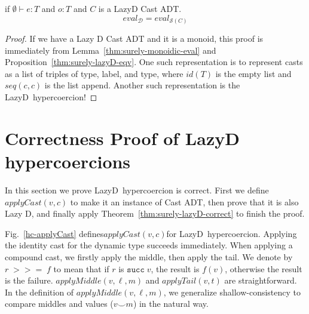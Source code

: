 \documentclass[acmsmall,review,anonymous]{acmart}\settopmatter{printfolios=true,printccs=false,printacmref=false}
\newcommand{\figref}[1]{Fig.~\ref{#1}}
\newcommand{\judgetype}[3]{#1 \vdash #2 : #3}
\newcommand{\lazyD}{Lazy\;D}
\newcommand{\rOOsucc}[1]{\mathtt{succ}\;#1}
\newcommand{\ineffCEKD}{$\mathcal{D}$}
\newcommand{\effCEK}[1]{$\mathcal{S}(#1)$}
\newcommand{\evalEqv}[2]{$eval_{\text{#1}} = eval_{\text{#2}}$}
\begin{document}
\begin{theorem}[\lazyD\ Cast ADT Respects \ineffCEKD]
	\label{thm:surely-lazyD-correct}
	if $\judgetype{\emptyset}{e}{T}$ and $o : T$ and $C$ is a 
	\lazyD{} Cast ADT.
	\[
	\text{\evalEqv{\ineffCEKD}{\effCEK{C}}}
	\]
\end{theorem}
\begin{proof}
	If we have a Lazy D Cast ADT and it is a monoid, this 
	proof is immediately from Lemma~\ref{thm:surely-monoidic-eval} and 
	Proposition~\ref{thm:surely-lazyD-eqv}. One such representation is to 
	represent casts as a list of triples of type, label, and type, where 
	$id(T)$ is the empty list and $seq(c,c)$ is the list append. Another such 
	representation is the \lazyD\ hypercoercion!
\end{proof}


\section{Correctness Proof of \lazyD{} hypercoercions}
\label{sec:hypercoercion-correctness}

In this section we prove \lazyD\ hypercoercion is 
correct. First we define$applyCast(v,c)$ to make it an instance of Cast ADT, 
then prove that it is also Lazy D, and finally apply 
Theorem~\ref{thm:surely-lazyD-correct} to finish the proof.

\figref{hc-applyCast} defines$applyCast(v,c)$for \lazyD\ hypercoercion. 
Applying the identity cast for the 
dynamic type succeeds immediately. When applying a compound cast, we firstly 
apply the middle, then apply the tail. We denote by $r \; >>= \; f$ to mean 
that if $r$ is $\rOOsucc{v}$, the result is $f(v)$, otherwise the result 
is the failure.
$ applyMiddle(v,\ell,m)$ and $applyTail(v,t)$ are straightforward.
In the definition of $applyMiddle(v,\ell,m)$, we generalize 
shallow-consistency to compare middles and values ($v \smile m$) in the 
natural way.
\end{document}
